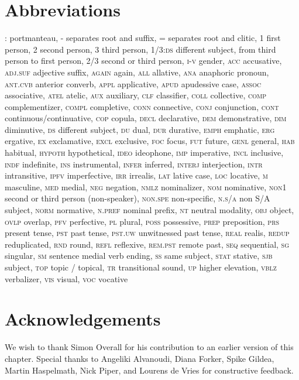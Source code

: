 \documentclass[output=paper]{LSP/langsci}
\begin{document}
\section*{Abbreviations}
\textsc{:}		portmanteau,
\textsc{-}		separates root and suffix,
\textsc{=}		separates root and clitic,
\textsc{1}		first person,
\textsc{2}		second person,
\textsc{3} 		third person,
\textsc{1/3:ds} 		different subject, from third person to first person,
\textsc{2/3} 		second or third person,
\textsc{i-v}		gender,
\textsc{acc}		accusative,
\textsc{adj.suf}		adjective suffix,
\textsc{again}		again,
\textsc{all}		allative,
\textsc{ana}		anaphoric pronoun,
\textsc{ant.cvb}	anterior converb,
\textsc{appl}		applicative,
\textsc{apud}		apudessive case,
\textsc{assoc}		associative,
\textsc{atel}		atelic,
\textsc{aux}		auxiliary,
\textsc{clf}		classifier,
\textsc{coll}		collective,
\textsc{comp}		complementizer,
\textsc{compl}		completive,
\textsc{conn}		connective,
\textsc{conj}		conjunction,
\textsc{cont} continuous/continuative,
\textsc{cop} copula,
\textsc{decl} declarative,
\textsc{dem}		demonstrative,
\textsc{dim}		diminutive,
\textsc{ds}		different subject,
\textsc{du}		dual,
\textsc{dur} durative,
\textsc{emph}		emphatic,
\textsc{erg}		ergative,
\textsc{ex}									exclamative,
\textsc{excl}		exclusive,
\textsc{foc}		focus,
\textsc{fut}		future,
\textsc{genl}		general,
\textsc{hab}		habitual,
\textsc{hypoth}		hypothetical,
\textsc{ideo}		ideophone,
\textsc{imp}		imperative,
\textsc{incl}		inclusive,
\textsc{indf}		indefinite,
\textsc{ins}		instrumental,
\textsc{infer} inferred,
\textsc{interj} interjection,
\textsc{intr} intransitive,
\textsc{ipfv}		imperfective,
\textsc{irr	}									irrealis,
\textsc{lat}		lative case,
\textsc{loc}		locative,
\textsc{m}		masculine,
\textsc{med} medial,
\textsc{neg}		negation,
\textsc{nmlz}		nominalizer,
\textsc{nom}		nominative,
\textsc{non1}								second or third person (non-speaker),
\textsc{non.spe}		non-specific,
\textsc{n.s/a} non S/A subject,
\textsc{norm}		normative,
\textsc{n.pref}		nominal prefix,
\textsc{nt}		neutral modality,
\textsc{obj} object,
\textsc{ovlp} overlap,
\textsc{pfv} perfective,
\textsc{pl}		plural,
\textsc{poss}		possessive,
\textsc{prep}		preposition,
\textsc{prs}		present tense,
\textsc{pst}		past tense,
\textsc{pst.uw}		unwitnessed past tense,
\textsc{real} realis,
\textsc{redup}		reduplicated,
\textsc{rnd}		round,
\textsc{refl}		reflexive,
\textsc{rem.pst}		remote past,
\textsc{seq}	sequential,
\textsc{sg}		singular,
\textsc{sm}		sentence medial verb ending,
\textsc{ss}		same subject,
\textsc{stat} stative,
\textsc{sjb}		subject,
\textsc{top}		topic / topical, 
\textsc{tr}		transitional sound,
\textsc{up} higher elevation,
\textsc{vblz}	verbalizer,
\textsc{vis}	visual,
\textsc{voc}		vocative


\section*{Acknowledgements}
We wish to thank Simon Overall for his contribution to an earlier version of this chapter. Special thanks to Angeliki Alvanoudi, Diana Forker, Spike Gildea, Martin Haspelmath, Nick Piper, and Lourens de Vries for constructive feedback. 

\sloppy
\printbibliography[heading=subbibliography,notkeyword=this] 
\end{document}
